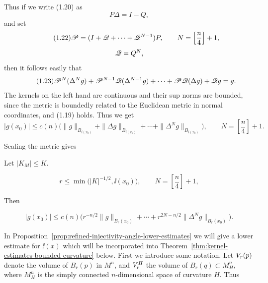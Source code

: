 Thus if we write (1.20) as
\begin{equation}\tag{1.21}
 P\Delta = I - Q,
\end{equation}
and set
\begin{equation}\tag{1.22}
 \mathscr{P} = (I + \mathscr{Q} + \cdots + \mathscr{Q}^{N-1})P,\qquad
 N=\left[\frac{n}{4}\right]+1,
\end{equation}
\[
\mathscr{Q} = Q^N,
\]
then it follows easily that
\begin{equation}\tag{1.23}
 \mathscr{P}^N(\Delta^N g) + \mathscr{P}^{N-1}\mathscr{Q}(\Delta^{N-1}g) + \cdots + \mathscr{P}\mathscr{Q}(\Delta g) + \mathscr{Q} g = g.
\end{equation}
The kernels on the left hand are continuous and their sup norms are bounded,
since the metric is boundedly related to the Euclidean metric in normal
coordinates, and (1.19) holds. Thus we get
\begin{equation}\tag{1.24}
|g(x_0)| \leq c(n)\bigl(\|g\|_{B_{i(x_0)}} + \|\Delta g\|_{B_{i(x_0)}} + \cdots + \|\Delta^N g\|_{B_{i(x_0)}}\bigr),
\qquad
N=\left[\frac{n}{4}\right]+1.
\end{equation}

Scaling the metric gives

\begin{proposition}
\label{prop:local-elliptic-estimate}

Let $\lvert K_M\rvert\leq K$.

\begin{equation}\tag{1.25}
r \leq \min\bigl(|K|^{-1/2}, \ii(x_0)\bigr),\qquad
N=\left[\frac{n}{4}\right]+1,
\end{equation}

Then

\begin{equation}\tag{1.26}
|g(x_0)| \leq c(n)\bigl(r^{-n/2}\|g\|_{B_r(x_0)} + \cdots + r^{2N-n/2}\|\Delta^N g\|_{B_r(x_0)}\bigr).
\end{equation}
\end{proposition}

In Proposition~\ref{prop:refined-injectivity-angle-lower-estimates} we will give a lower estimate for $\ii(x)$ which will be
incorporated into Theorem~\ref{thm:kernel-estimates-bounded-curvature} below. First we introduce some notation.
Let $V_r(p)$ denote the volume of $B_r(p)$ in $M^n$, and $V_r^{H}$ the volume of
$B_r(q)\subset M_H^n$, where $M_H^n$ is the simply connected $n$-dimensional
space of curvature $H$. Thus

